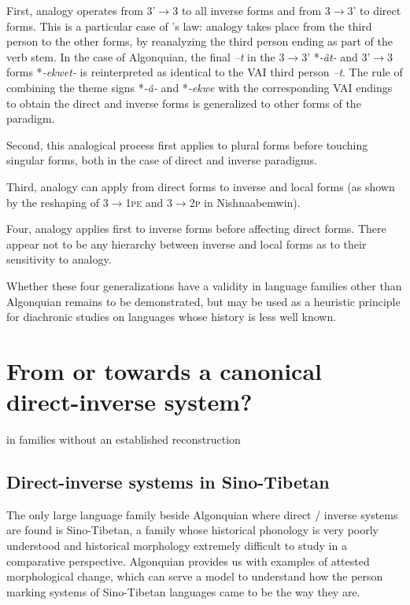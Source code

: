 \documentclass[twoside,a4paper,11pt]{article}
\newcommand{\ipa}[1]{{\phon\textit{#1}}}
\newcommand{\Σ}{\greek{Σ}}
\begin{document}
First, analogy operates from 3'$\rightarrow$3 to all inverse forms and from 3$\rightarrow$3' to direct forms. This is a particular case of   \citealt{watkins62celtic}'s law: analogy takes place from the third person to the other forms, by reanalyzing the third person ending as part of the verb stem. In the case of Algonquian, the final  \ipa{--t}  in the 3$\rightarrow$3' *\ipa{-ât-} and 3'$\rightarrow$3 forms *\ipa{-ekwet-} is reinterpreted as identical to the VAI third person \ipa{--t}.  The rule of combining the  theme signs *\ipa{-â-} and *\ipa{-ekwe}   with the corresponding VAI endings to obtain the direct and inverse forms  is generalized to other forms of the paradigm.

Second, this analogical process first applies to plural forms before touching singular forms, both in the case of direct and inverse paradigms.
 
Third, analogy can apply from direct forms to inverse and  local forms (as shown by the reshaping of \textsc{3$\rightarrow$1pe} and \textsc{3$\rightarrow$2p} in Nishnaabemwin).

Four, analogy applies first to inverse forms before affecting direct forms. There appear not to be any hierarchy between inverse and local forms as to their sensitivity to analogy.
 
 
 Whether these four generalizations have a validity in language families other than Algonquian remains to be demonstrated, but may be used as a heuristic principle for diachronic studies on languages whose history is less well known.
 
\section{From or towards a canonical direct-inverse system?}

in families without an established reconstruction

\subsection{Direct-inverse systems in Sino-Tibetan}

The only   large language family beside Algonquian where direct / inverse systems are found is Sino-Tibetan, a family whose historical phonology is very poorly understood and historical morphology extremely difficult to study in a comparative perspective. Algonquian provides us with examples of attested morphological change, which can serve a model to understand how the person marking systems of Sino-Tibetan languages came to be the way they are.
\end{document}
